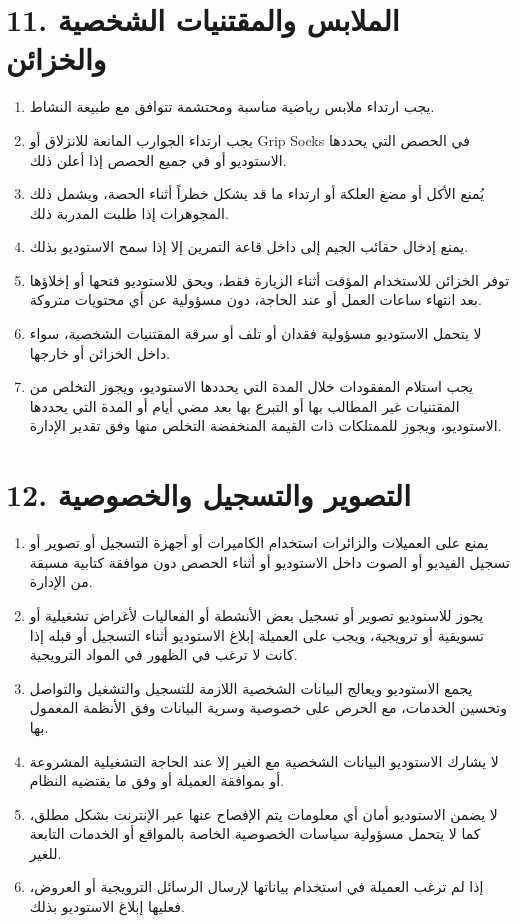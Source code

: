 \documentclass[12pt,a4paper]{article}
\newcommand{\engnum}[1]{\textLR{#1}}
\begin{document}
\section*{11. الملابس والمقتنيات الشخصية والخزائن}
\begin{enumerate}
    \item يجب ارتداء ملابس رياضية مناسبة ومحتشمة تتوافق مع طبيعة النشاط.
    \item يجب ارتداء الجوارب المانعة للانزلاق أو Grip Socks في الحصص التي يحددها الاستوديو أو في جميع الحصص إذا أعلن ذلك.
    \item يُمنع الأكل أو مضغ العلكة أو ارتداء ما قد يشكل خطراً أثناء الحصة، ويشمل ذلك المجوهرات إذا طلبت المدربة ذلك.
    \item يمنع إدخال حقائب الجيم إلى داخل قاعة التمرين إلا إذا سمح الاستوديو بذلك.
    \item توفر الخزائن للاستخدام المؤقت أثناء الزيارة فقط، ويحق للاستوديو فتحها أو إخلاؤها بعد انتهاء ساعات العمل أو عند الحاجة، دون مسؤولية عن أي محتويات متروكة.
    \item لا يتحمل الاستوديو مسؤولية فقدان أو تلف أو سرقة المقتنيات الشخصية، سواء داخل الخزائن أو خارجها.
    \item يجب استلام المفقودات خلال المدة التي يحددها الاستوديو، ويجوز التخلص من المقتنيات غير المطالب بها أو التبرع بها بعد مضي \engnum{7} أيام أو المدة التي يحددها الاستوديو، ويجوز للممتلكات ذات القيمة المنخفضة التخلص منها وفق تقدير الإدارة.
\end{enumerate}

\section*{12. التصوير والتسجيل والخصوصية}
\begin{enumerate}
    \item يمنع على العميلات والزائرات استخدام الكاميرات أو أجهزة التسجيل أو تصوير أو تسجيل الفيديو أو الصوت داخل الاستوديو أو أثناء الحصص دون موافقة كتابية مسبقة من الإدارة.
    \item يجوز للاستوديو تصوير أو تسجيل بعض الأنشطة أو الفعاليات لأغراض تشغيلية أو تسويقية أو ترويجية، ويجب على العميلة إبلاغ الاستوديو أثناء التسجيل أو قبله إذا كانت لا ترغب في الظهور في المواد الترويجية.
    \item يجمع الاستوديو ويعالج البيانات الشخصية اللازمة للتسجيل والتشغيل والتواصل وتحسين الخدمات، مع الحرص على خصوصية وسرية البيانات وفق الأنظمة المعمول بها.
    \item لا يشارك الاستوديو البيانات الشخصية مع الغير إلا عند الحاجة التشغيلية المشروعة أو بموافقة العميلة أو وفق ما يقتضيه النظام.
    \item لا يضمن الاستوديو أمان أي معلومات يتم الإفصاح عنها عبر الإنترنت بشكل مطلق، كما لا يتحمل مسؤولية سياسات الخصوصية الخاصة بالمواقع أو الخدمات التابعة للغير.
    \item إذا لم ترغب العميلة في استخدام بياناتها لإرسال الرسائل الترويجية أو العروض، فعليها إبلاغ الاستوديو بذلك.
\end{enumerate}
\end{document}
